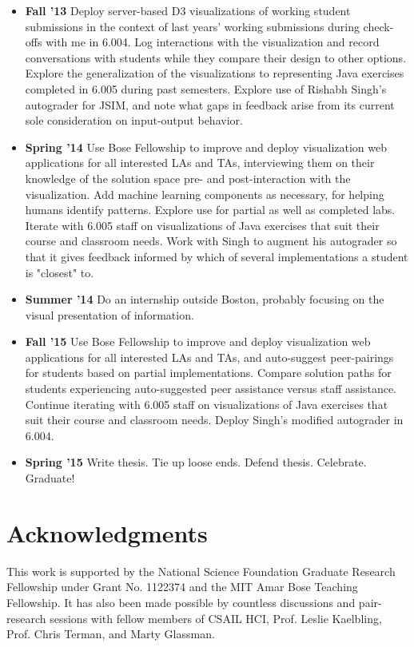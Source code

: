 \documentclass[12pt]{article}
\begin{document}
\begin{itemize}
\item {\bf Fall '13} Deploy server-based D3 visualizations of working student submissions in the context of last years' working submissions during check-offs with me in 6.004. Log interactions with the visualization and record conversations with students while they compare their design to other options. Explore the generalization of the visualizations to representing Java exercises completed in 6.005 during past semesters. Explore use of Rishabh Singh's autograder for JSIM, and note what gaps in feedback arise from its current sole consideration on input-output behavior.
\item {\bf Spring '14} Use Bose Fellowship to improve and deploy visualization web applications for all interested LAs and TAs, interviewing them on their knowledge of the solution space pre- and post-interaction with the visualization. Add machine learning components as necessary, for helping humans identify patterns. Explore use for partial as well as completed labs. Iterate with 6.005 staff on visualizations of Java exercises that suit their course and classroom needs. Work with Singh to augment his autograder so that it gives feedback informed by which of several implementations a student is "closest" to.
\item {\bf Summer '14} Do an internship outside Boston, probably focusing on the visual presentation of information.
\item {\bf Fall '15} Use Bose Fellowship to improve and deploy visualization web applications for all interested LAs and TAs, and auto-suggest peer-pairings for students based on partial implementations. Compare solution paths for students experiencing auto-suggested peer assistance versus staff assistance. Continue iterating with 6.005 staff on visualizations of Java exercises that suit their course and classroom needs. Deploy Singh's modified autograder in 6.004.
\item {\bf Spring '15} Write thesis. Tie up loose ends. Defend thesis. Celebrate. Graduate!
\end{itemize}

\section{Acknowledgments}
This work is supported by the National Science Foundation Graduate Research Fellowship under Grant No. 1122374 and the MIT Amar Bose Teaching Fellowship. It has also been made possible by countless discussions and pair-research sessions with fellow members of CSAIL HCI, Prof. Leslie Kaelbling, Prof. Chris Terman, and Marty Glassman.
\end{document}

